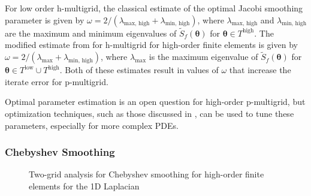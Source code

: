 \documentclass[review]{siamart190516}
\begin{document}
For low order h-multigrid, the classical estimate of the optimal Jacobi smoothing parameter is given by $\omega = 2 / \left( \lambda_{\text{max, high}} + \lambda_{\text{min, high}} \right)$, where $\lambda_{\text{max, high}}$ and $\lambda_{\text{min, high}}$ are the maximum and minimum eigenvalues of $\tilde{S}_f \left( \boldsymbol{\theta} \right)$ for $\boldsymbol{\theta} \in T^{\text{high}}$.
The modified estimate from \cite{he2020two} for h-multigrid for high-order finite elements is given by $\omega = 2 / \left( \lambda_{\text{max}} + \lambda_{\text{min, high}} \right)$, where $\lambda_{\text{max}}$ is the maximum eigenvalue of $\tilde{S}_f \left( \boldsymbol{\theta} \right)$ for $\boldsymbol{\theta} \in T^{\text{low}} \cup T^{\text{high}}$.
Both of these estimates result in values of $\omega$ that increase the iterate error for p-multigrid.

Optimal parameter estimation is an open question for high-order p-multigrid, but optimization techniques, such as those discussed in \cite{brown2021tuning}, can be used to tune these parameters, especially for more complex PDEs.

\subsubsection{Chebyshev Smoothing}

\begin{figure}[!tbp]
  \centering
  \caption{Two-grid analysis for Chebyshev smoothing for high-order finite elements for the 1D Laplacian}
\end{figure}
\end{document}
